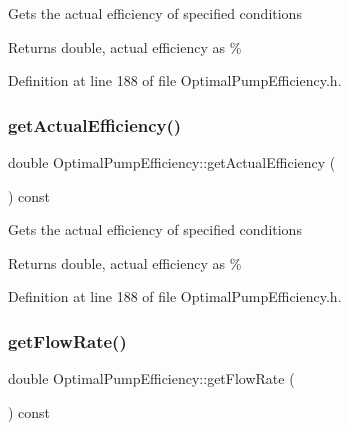 Gets the actual efficiency of specified conditions

\begin{DoxyReturn}{Returns}
double, actual efficiency as \% 
\end{DoxyReturn}


Definition at line 188 of file Optimal\+Pump\+Efficiency.\+h.

\mbox{\label{class_optimal_pump_efficiency_aa2ac8a7c61bc28f82e30cb44b9c21008}} 
\subsubsection{\texorpdfstring{get\+Actual\+Efficiency()}{getActualEfficiency()}\hspace{0.1cm}{\footnotesize\ttfamily [3/3]}}
{\footnotesize\ttfamily double Optimal\+Pump\+Efficiency\+::get\+Actual\+Efficiency (\begin{DoxyParamCaption}{ }\end{DoxyParamCaption}) const\hspace{0.3cm}{\ttfamily [inline]}}

Gets the actual efficiency of specified conditions

\begin{DoxyReturn}{Returns}
double, actual efficiency as \% 
\end{DoxyReturn}


Definition at line 188 of file Optimal\+Pump\+Efficiency.\+h.

\mbox{\label{class_optimal_pump_efficiency_a77c6618681b0fd3a0fc02dc49d16ee99}} 
\subsubsection{\texorpdfstring{get\+Flow\+Rate()}{getFlowRate()}\hspace{0.1cm}{\footnotesize\ttfamily [1/3]}}
{\footnotesize\ttfamily double Optimal\+Pump\+Efficiency\+::get\+Flow\+Rate (\begin{DoxyParamCaption}{ }\end{DoxyParamCaption}) const\hspace{0.3cm}{\ttfamily [inline]}}

